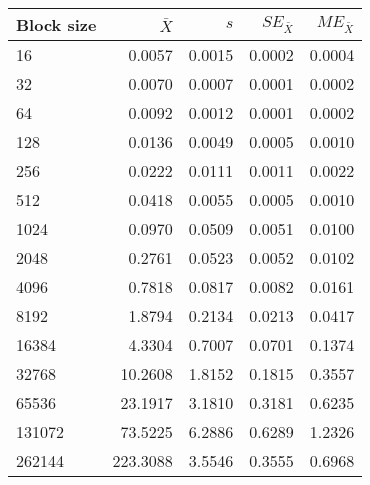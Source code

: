 \begin{tabular}{lrrrr}\toprule
{\small Block size} & $\bar{X}$ & $s$ & $SE_{\bar{X}}$ & $ME_{\bar{X}}$ \\\midrule
16 & 0.0057 & 0.0015 & 0.0002 & 0.0004\\
32 & 0.0070 & 0.0007 & 0.0001 & 0.0002\\
64 & 0.0092 & 0.0012 & 0.0001 & 0.0002\\
128 & 0.0136 & 0.0049 & 0.0005 & 0.0010\\
256 & 0.0222 & 0.0111 & 0.0011 & 0.0022\\
512 & 0.0418 & 0.0055 & 0.0005 & 0.0010\\
1024 & 0.0970 & 0.0509 & 0.0051 & 0.0100\\
2048 & 0.2761 & 0.0523 & 0.0052 & 0.0102\\
4096 & 0.7818 & 0.0817 & 0.0082 & 0.0161\\
8192 & 1.8794 & 0.2134 & 0.0213 & 0.0417\\
16384 & 4.3304 & 0.7007 & 0.0701 & 0.1374\\
32768 & 10.2608 & 1.8152 & 0.1815 & 0.3557\\
65536 & 23.1917 & 3.1810 & 0.3181 & 0.6235\\
131072 & 73.5225 & 6.2886 & 0.6289 & 1.2326\\
262144 & 223.3088 & 3.5546 & 0.3555 & 0.6968\\
\bottomrule
\end{tabular}
